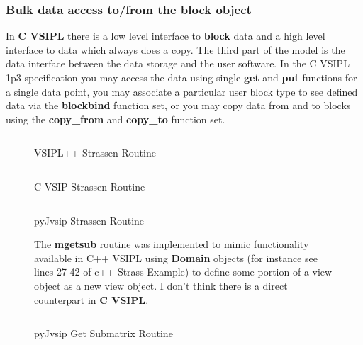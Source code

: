 \documentclass[11pt, oneside]{article}
\newcommand{\cvl}{\ttbf{C VSIPL}}
\newcommand{\ttbf}[1]{{\ttfamily \bfseries #1}}
\newcommand{\blk}{\ttbf{block}}
\begin{document}
\subsubsection{Bulk data access to/from the \blk{} object}
In \cvl{} there is a low level interface to \blk{} data and a high level interface to data which always does a copy. 
The third part of the model is the data interface between the data storage and the user software.  In the C VSIPL 1p3 specification you may access the data using single \ttbf{get} and \ttbf{put} functions for a single data point, you may associate a particular user block type to see defined data via the \ttbf{blockbind} function set, or you may copy data from and to blocks using the \ttbf{copy\_from} and \ttbf{copy\_to} function set.
%
\begin{figure}[t]
\caption{VSIPL++ Strassen Routine}
\inputminted[linenos=true,resetmargins=true,xleftmargin=.50cm,fontfamily=tt, fontsize= \small]{cpp}{./codeEx/strassFunc.cpp}
\end{figure}
%
\begin{figure}[t]
\caption{C VSIP Strassen Routine}
\inputminted[linenos=true,resetmargins=true,xleftmargin=.50cm,fontfamily=tt, fontsize= \small]{c}{./codeEx/strassFunc.c}
\end{figure}
%
\begin{figure}[t]
\caption{pyJvsip Strassen Routine}
\inputminted[linenos=true,resetmargins=true,xleftmargin=.50cm,fontfamily=tt, fontsize= \small]{python}{./codeEx/strassFunc.py}
\end{figure}
%
\begin{figure}[t]
\caption{pyJvsip Get Submatrix Routine}
{The \ttbf{mgetsub} routine was implemented to mimic functionality available in C++ VSIPL using \ttbf{Domain} objects (for instance see lines 27-42 of c++ Strass Example)  to define some portion of a view object as a new view object. I don't think there is a direct counterpart in \cvl{}.}
\inputminted[linenos=true,resetmargins=true,xleftmargin=.50cm,fontfamily=tt, fontsize= \small]{python}{./pyJvsip_examples/mgetsub.py}
\end{figure}
\end{document}
